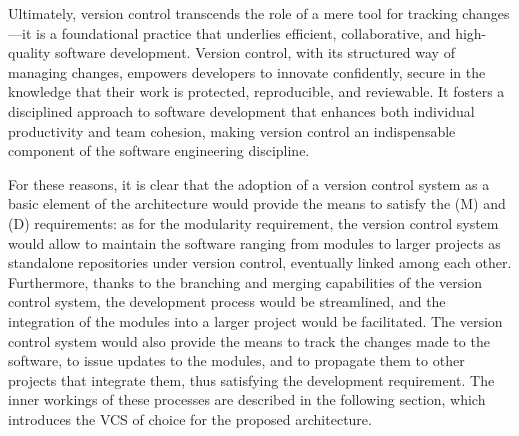 Ultimately, version control transcends the role of a mere tool for tracking changes—it is a foundational practice that underlies efficient, collaborative, and high-quality software development. Version control, with its structured way of managing changes, empowers developers to innovate confidently, secure in the knowledge that their work is protected, reproducible, and reviewable. It fosters a disciplined approach to software development that enhances both individual productivity and team cohesion, making version control an indispensable component of the software engineering discipline.

For these reasons, it is clear that the adoption of a version control system as a basic element of the architecture would provide the means to satisfy the (M) and (D) requirements: as for the modularity requirement, the version control system would allow to maintain the software ranging from modules to larger projects as standalone repositories under version control, eventually linked among each other. Furthermore, thanks to the branching and merging capabilities of the version control system, the development process would be streamlined, and the integration of the modules into a larger project would be facilitated. The version control system would also provide the means to track the changes made to the software, to issue updates to the modules, and to propagate them to other projects that integrate them, thus satisfying the development requirement. The inner workings of these processes are described in the following section, which introduces the VCS of choice for the proposed architecture.

